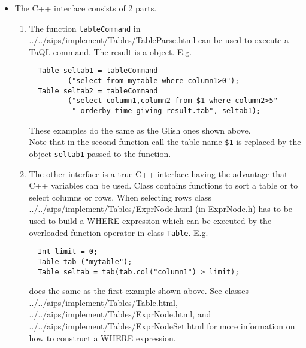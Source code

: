 \begin{itemize}
\item
  The C++ interface consists of 2 parts.
  \begin{enumerate}
  \item
    The function \texttt{tableCommand} in
    {../../aips/implement/Tables/TableParse.html}
    can be used to execute a TaQL command. The result is a
    object. E.g.
\begin{verbatim}
  Table seltab1 = tableCommand
         ("select from mytable where column1>0");
  Table seltab2 = tableCommand
         ("select column1,column2 from $1 where column2>5"
          " orderby time giving result.tab", seltab1);
\end{verbatim}
    These examples do the same as the Glish ones shown above.
    \\Note that in the second function call the table name
    \texttt{\$1} is replaced by the object \texttt{seltab1}
    passed to the function.

  \item
    The other interface is a true C++ interface having the
    advantage that C++ variables can be used. Class
    contains functions to sort a table or to select columns or rows.
    When selecting rows class 
    {../../aips/implement/Tables/ExprNode.html} (in ExprNode.h)
    has to be used to
    build a WHERE expression which can be executed by the overloaded
    function operator in class \texttt{Table}. E.g.
\begin{verbatim}
  Int limit = 0;
  Table tab ("mytable");
  Table seltab = tab(tab.col("column1") > limit);
\end{verbatim}
    does the same as the first example shown above.
    See classes 
    {../../aips/implement/Tables/Table.html},
    {../../aips/implement/Tables/ExprNode.html}, and
    {../../aips/implement/Tables/ExprNodeSet.html} for more
    information on how to construct a WHERE expression.
  \end{enumerate}
  
\end{itemize}

